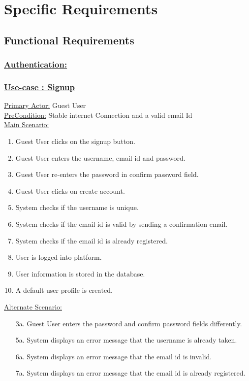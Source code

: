 \documentclass[conference,compsoc]{IEEEtran}
\newcounter{UC}
\newcommand{\nextU}{\stepcounter{UC}\theUC}
\begin{document}
\section{Specific Requirements}
\subsection{Functional Requirements}
\subsubsection{\underline{Authentication:}}
\vspace{0.2cm}
\subsubsection*{\underline{Use-case \nextU: Signup}}
\vspace{0.2cm}
\underline{Primary Actor:} Guest User\\

\underline{PreCondition:} Stable internet Connection and a valid email Id\\

\underline{Main Scenario:}\\
\begin{enumerate}
    \item Guest User clicks on the signup button.
    \item Guest User enters the username, email id and password.
    \item Guest User re-enters the password in confirm password field.
    \item Guest User clicks on create account.
    \item System checks if the username is unique.
    \item System checks if the email id is valid by sending a confirmation email.
    \item System checks if the email id is already registered.
    \item User is logged into platform.
    \item User information is stored in the database.
    \item A default user profile is created.
\end{enumerate}
\underline{Alternate Scenario:}
\begin{enumerate}
    \item [3a.] Guest User enters the password and confirm password fields differently.
    \item [5a.] System displays an error message that the username is already taken.
    \item [6a.] System displays an error message that the email id is invalid.
    \item [7a.] System displays an error message that the email id is already registered.
\end{enumerate}\vspace{0.2cm}
\end{document}
